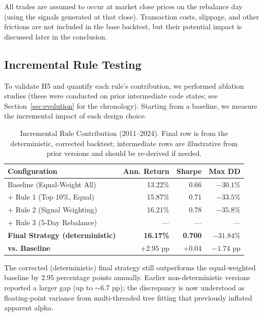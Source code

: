 \documentclass[conference]{IEEEtran}
\begin{document}
All trades are assumed to occur at market close prices on the rebalance day (using the signals generated at that close). Transaction costs, slippage, and other frictions are not included in the base backtest, but their potential impact is discussed later in the conclusion.

\subsection{Incremental Rule Testing}
To validate H5 and quantify each rule's contribution, we performed ablation studies (these were conducted on prior intermediate code states; see Section~\ref{sec:evolution} for the chronology). Starting from a baseline, we measure the incremental impact of each design choice.

\begin{table}[!t]
\caption{Incremental Rule Contribution (2011--2024). Final row is from the deterministic, corrected backtest; intermediate rows are illustrative from prior versions and should be re-derived if needed.}
\label{tab:incremental}
\centering
\begin{tabular}{lrrr}
\toprule
\textbf{Configuration} & \textbf{Ann. Return} & \textbf{Sharpe} & \textbf{Max DD} \\
\midrule
Baseline (Equal-Weight All) & 13.22\% & 0.66 & $-30.1\%$ \\
+ Rule 1 (Top 10\%, Equal) & 15.87\% & 0.71 & $-33.5\%$ \\
+ Rule 2 (Signal Weighting) & 16.21\% & 0.78 & $-35.8\%$ \\
+ Rule 3 (5-Day Rebalance) & --- & --- & --- \\
\midrule
\textbf{Final Strategy (deterministic)} & \textbf{16.17\%} & \textbf{0.700} & \textbf{$-31.84\%$} \\
\midrule
\textbf{vs. Baseline} & +2.95 pp & +0.04 & $-1.74$ pp \\
\bottomrule
\end{tabular}
\end{table}

The corrected (deterministic) final strategy still outperforms the equal-weighted baseline by 2.95 percentage points annually. Earlier non-deterministic versions reported a larger gap (up to $\sim$6.7 pp); the discrepancy is now understood as floating-point variance from multi-threaded tree fitting that previously inflated apparent alpha.
\end{document}
